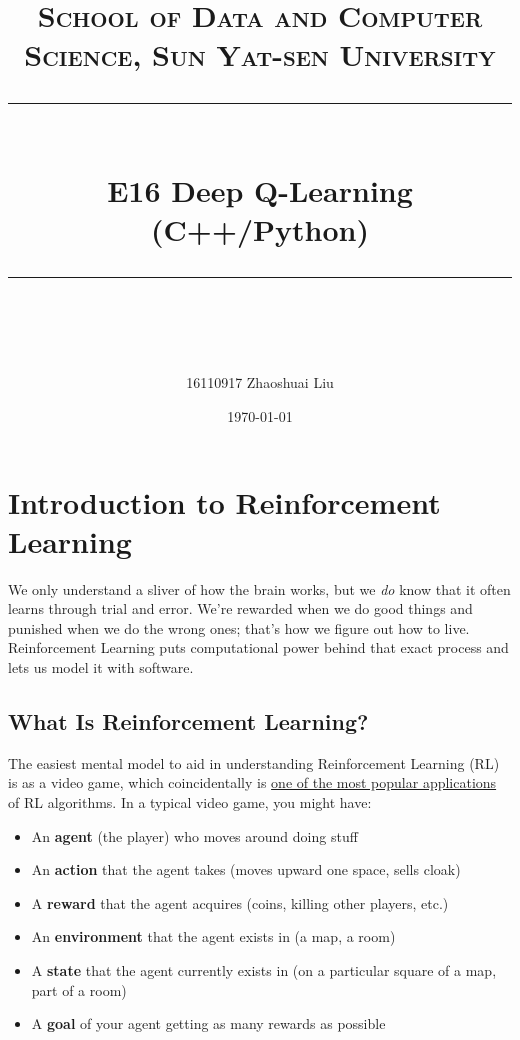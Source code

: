 \documentclass[a4paper, 11pt]{article}
\title{	
\normalfont \normalsize
\textsc{School of Data and Computer Science, Sun Yat-sen University} \\ [25pt] %
\rule{\textwidth}{0.5pt} \\[0.4cm] %
\huge  E16 Deep Q-Learning (C++/Python)\\ %
\rule{\textwidth}{2pt} \\[0.5cm] %
\author{16110917 Zhaoshuai Liu}
\date{\normalsize\today}
}
\begin{document}
\maketitle
\tableofcontents
\newpage


\section{Introduction to Reinforcement Learning}

{}

We only understand a sliver of how the brain works, but we \emph{do}
know that it often learns through trial and error. We're rewarded when
we do good things and punished when we do the wrong ones; that's how we
figure out how to live. Reinforcement Learning puts computational power
behind that exact process and lets us model it with software.

\subsection{\textbf{What Is Reinforcement Learning?}}

The easiest mental model to aid in understanding Reinforcement Learning
(RL) is as a video game, which coincidentally is
\href{https://www.cs.toronto.edu/~vmnih/docs/dqn.pdf}{one of the most
popular applications} of RL algorithms. In a typical video game, you
might have:

\begin{itemize}
\itemsep1pt\parskip0pt
\item
  An \textbf{agent} (the player) who moves around doing stuff
\item
  An \textbf{action} that the agent takes (moves upward one space, sells
  cloak)
\item
  A \textbf{reward} that the agent acquires (coins, killing other
  players, etc.)
\item
  An \textbf{environment} that the agent exists in (a map, a room)
\item
  A \textbf{state} that the agent currently exists in (on a particular
  square of a map, part of a room)
\item
  A \textbf{goal} of your agent getting as many rewards as possible
\end{itemize}
\end{document}
